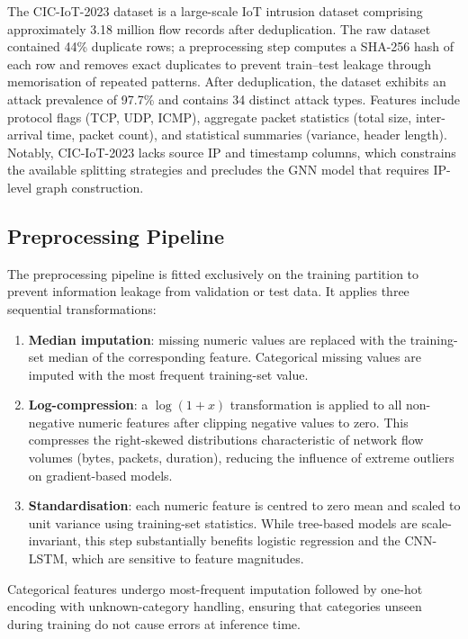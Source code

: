 \documentclass[12pt,a4paper]{report}
\begin{document}
The CIC-IoT-2023 dataset \citep{cic2023} is a large-scale IoT intrusion dataset comprising approximately 3.18 million flow records after deduplication. The raw dataset contained 44\% duplicate rows; a preprocessing step computes a SHA-256 hash of each row and removes exact duplicates to prevent train--test leakage through memorisation of repeated patterns. After deduplication, the dataset exhibits an attack prevalence of 97.7\% and contains 34 distinct attack types. Features include protocol flags (TCP, UDP, ICMP), aggregate packet statistics (total size, inter-arrival time, packet count), and statistical summaries (variance, header length). Notably, CIC-IoT-2023 lacks source IP and timestamp columns, which constrains the available splitting strategies and precludes the GNN model that requires IP-level graph construction.

\subsection{Preprocessing Pipeline}
\label{sec:preprocess}

The preprocessing pipeline is fitted exclusively on the training partition to prevent information leakage from validation or test data. It applies three sequential transformations:

\begin{enumerate}
  \item \textbf{Median imputation}: missing numeric values are replaced with the training-set median of the corresponding feature. Categorical missing values are imputed with the most frequent training-set value.
  \item \textbf{Log-compression}: a $\log(1 + x)$ transformation is applied to all non-negative numeric features after clipping negative values to zero. This compresses the right-skewed distributions characteristic of network flow volumes (bytes, packets, duration), reducing the influence of extreme outliers on gradient-based models.
  \item \textbf{Standardisation}: each numeric feature is centred to zero mean and scaled to unit variance using training-set statistics. While tree-based models are scale-invariant, this step substantially benefits logistic regression and the CNN-LSTM, which are sensitive to feature magnitudes.
\end{enumerate}

Categorical features undergo most-frequent imputation followed by one-hot encoding with unknown-category handling, ensuring that categories unseen during training do not cause errors at inference time.
\end{document}
